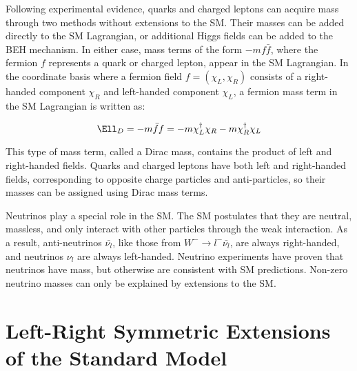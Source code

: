 Following experimental evidence, quarks and charged leptons can acquire mass through two methods without 
extensions to the SM.  Their masses can be added directly to the SM Lagrangian, or additional Higgs fields 
can be added to the BEH mechanism.  In either case, mass terms of the form $-mf\bar{f}$, where the fermion 
$f$ represents a quark or charged lepton, appear in the SM Lagrangian.  In the coordinate basis where a 
fermion field $f = (\chi_{L},\chi_{R})$ consists of a right-handed component $\chi_{R}$ and left-handed 
component $\chi_{L}$, a fermion mass term in the SM Lagrangian is written as:

\begin{equation}
	\Ell_{D} = -m\bar{f}f = -m\chi^{\dagger}_{L}\chi_{R} - m\chi^{\dagger}_{R}\chi_{L}
\end{equation}

This type of mass term, called a Dirac mass, contains the product of left and right-handed fields.  Quarks 
and charged leptons have both left and right-handed fields, corresponding to opposite charge particles and 
anti-particles, so their masses can be assigned using Dirac mass terms.

Neutrinos play a special role in the SM.  The SM postulates that they are neutral, massless, and only interact 
with other particles through the weak interaction.  As a result, anti-neutrinos $\bar{\nu_{l}}$, like those 
from $W^{-} \rightarrow l^{-}\bar{\nu_{l}}$, are always right-handed, and neutrinos $\nu_{l}$ are always 
left-handed.  Neutrino experiments \cite{NOvAresults,mainzPhaseIIResults,t2kResults} have proven that neutrinos 
have mass, but otherwise are consistent with SM predictions.  Non-zero neutrino masses can only be explained 
by extensions to the SM.


\section{Left-Right Symmetric Extensions of the Standard Model}


